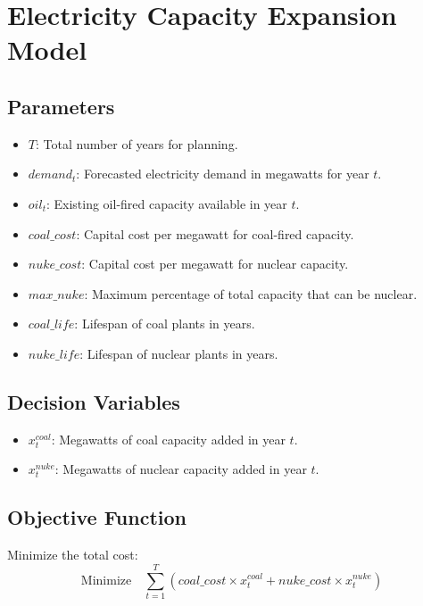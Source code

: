 \documentclass{article}
\begin{document}
\section*{Electricity Capacity Expansion Model}

\subsection*{Parameters}
\begin{itemize}
    \item $T$: Total number of years for planning.
    \item $demand_t$: Forecasted electricity demand in megawatts for year $t$.
    \item $oil_t$: Existing oil-fired capacity available in year $t$.
    \item $coal\_cost$: Capital cost per megawatt for coal-fired capacity.
    \item $nuke\_cost$: Capital cost per megawatt for nuclear capacity.
    \item $max\_nuke$: Maximum percentage of total capacity that can be nuclear.
    \item $coal\_life$: Lifespan of coal plants in years.
    \item $nuke\_life$: Lifespan of nuclear plants in years.
\end{itemize}

\subsection*{Decision Variables}
\begin{itemize}
    \item $x_t^{coal}$: Megawatts of coal capacity added in year $t$.
    \item $x_t^{nuke}$: Megawatts of nuclear capacity added in year $t$.
\end{itemize}

\subsection*{Objective Function}
Minimize the total cost:
\[
\text{Minimize} \quad \sum_{t=1}^{T} (coal\_cost \times x_t^{coal} + nuke\_cost \times x_t^{nuke})
\]
\end{document}
